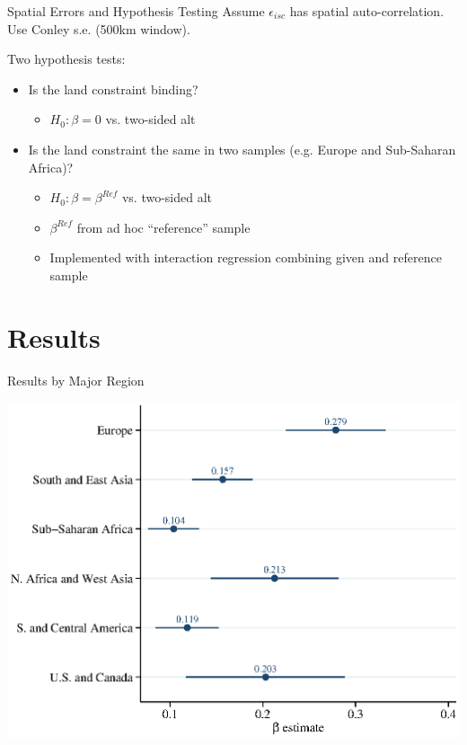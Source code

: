 \documentclass[10pt, xcolor=dvipsnames]{beamer}
\begin{document}
\begin{frame}{Spatial Errors and Hypothesis Testing}\label{testing}
Assume $\epsilon_{isc}$ has spatial auto-correlation. Use Conley s.e. (500km window). 

\vspace{.2cm} Two hypothesis tests:
\begin{itemize}
  \item Is the land constraint binding? 
    \begin{itemize}
      \item $H_0: \beta=0$ vs. two-sided alt 
    \end{itemize}
  \item Is the land constraint the same in two samples (e.g. Europe and Sub-Saharan Africa)? 
    \begin{itemize}
      \item $H_0: \beta = \beta^{Ref}$ vs. two-sided alt 
      \item $\beta^{Ref}$ from ad hoc ``reference'' sample
      \item Implemented with interaction regression combining given and reference sample
    \end{itemize}
\end{itemize}
\hfill \hyperlink{interaction}{}
\end{frame}

\section{Results}

\begin{frame}{Results by Major Region}\label{region}
\begin{center}
\includegraphics[width=.8\textwidth]{fig_coef_region.eps}
\end{center}
\end{frame}
\end{document}
